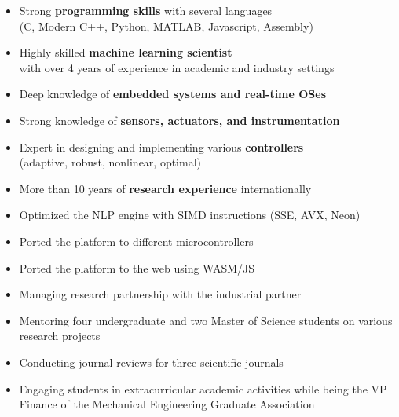 \documentclass[10pt,letterpaper,ragged2e,compact]{mocv}
\begin{document}
\begin{paracol}{2}
    \begin{itemize}
        \item Strong \textbf{programming skills} with several languages \\
            (C, Modern C++, Python, MATLAB, Javascript, Assembly)
        \item Highly skilled \textbf{machine learning scientist} \\
            with over 4 years of experience in academic and industry settings
        \item Deep knowledge of \textbf{embedded systems and real-time OSes} \\
        \item Strong knowledge of \textbf{sensors, actuators, and instrumentation}
        \item Expert in designing and implementing various \textbf{controllers} \\
            (adaptive, robust, nonlinear, optimal)
        \item More than 10 years of \textbf{research experience} internationally
    \end{itemize}
    \begin{itemize}
        \item Optimized the NLP engine with SIMD instructions (SSE, AVX, Neon)
        \item Ported the platform to different microcontrollers
        \item Ported the platform to the web using WASM/JS
    \end{itemize}
    \divider
    \begin{itemize}
        \item Managing research partnership with the industrial partner %
        \item Mentoring four undergraduate and two Master of Science students on various research projects
        \item Conducting journal reviews for three scientific journals
        \item Engaging students in extracurricular academic activities while being the VP Finance of the Mechanical Engineering Graduate Association 

\end{itemize}
\end{paracol}
\end{document}
